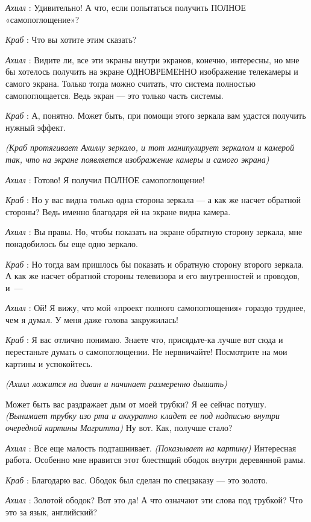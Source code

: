 \emph{Ахилл} : Удивительно! А что, если попытаться получить ПОЛНОЕ «самопоглощение»?

\emph{Краб} : Что вы хотите этим сказать?

\emph{Ахилл} : Видите ли, все эти экраны внутри экранов, конечно, интересны, но мне бы хотелось получить на экране ОДНОВРЕМЕННО изображение телекамеры и самого экрана. Только тогда можно считать, что система полностью самопоглощается. Ведь экран --- это только часть системы.

\emph{Краб} : А, понятно. Может быть, при помощи этого зеркала вам удастся получить нужный эффект.

\emph{(Краб протягивает Ахиллу зеркало, и тот манипулирует зеркалом и камерой так, что на экране появляется изображение камеры и самого экрана)}

\emph{Ахилл} : Готово! Я получил ПОЛНОЕ самопоглощение!

\emph{Краб} : Но у вас видна только одна сторона зеркала --- а как же насчет обратной стороны? Ведь именно благодаря ей на экране видна камера.

\emph{Ахилл} : Вы правы. Но, чтобы показать на экране обратную сторону зеркала, мне понадобилось бы еще одно зеркало.

\emph{Краб} : Но тогда вам пришлось бы показать и обратную сторону второго зеркала. А как же насчет обратной стороны телевизора и его внутренностей и проводов, и~---

\emph{Ахилл} : Ой! Я вижу, что мой «проект полного самопоглощения» гораздо труднее, чем я думал. У меня даже голова закружилась!

\emph{Краб} : Я вас отлично понимаю. Знаете что, присядьте-ка лучше вот сюда и перестаньте думать о самопоглощении. Не нервничайте! Посмотрите на мои картины и успокойтесь.

\emph{(Ахилл ложится на диван и начинает размеренно дышать)}

Может быть вас раздражает дым от моей трубки? Я ее сейчас потушу. \emph{(Вынимает трубку изо рта и аккуратно кладет ее под надписью внутри очередной картины Магритта)} Ну вот. Как, получше стало?

\emph{Ахилл} : Все еще малость подташнивает. \emph{(Показывает на картину)} Интересная работа. Особенно мне нравится этот блестящий ободок внутри деревянной рамы.

\emph{Краб} : Благодарю вас. Ободок был сделан по спецзаказу --- это золото.

\emph{Ахилл} : Золотой ободок? Вот это да! А что означают эти слова под трубкой? Что это за язык, английский?

